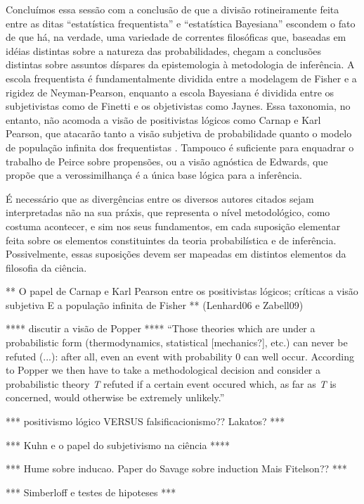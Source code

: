 Concluímos essa sessão com a conclusão de que a divisão rotineiramente feita entre as ditas ``estatística frequentista'' e 
``estatística Bayesiana'' escondem o fato de que há, na verdade, uma variedade de correntes filosóficas que, baseadas
em idéias distintas sobre a natureza das probabilidades, chegam a conclusões distintas sobre assuntos díspares da epistemologia 
à metodologia de inferência. A escola frequentista é fundamentalmente dividida entre a modelagem de Fisher e a rigidez de
Neyman-Pearson, enquanto a escola Bayesiana é dividida entre os subjetivistas como de Finetti e os objetivistas como Jaynes.
Essa taxonomia, no entanto, não acomoda a visão de positivistas lógicos como Carnap e Karl Pearson, que atacarão tanto
a visão subjetiva de probabilidade quanto o modelo de população infinita dos frequentistas \citep{Lenhard06, Zabell09}.
Tampouco é suficiente para enquadrar o trabalho de Peirce sobre propensões, ou a visão agnóstica de Edwards, que propõe
que a verossimilhança é a única base lógica para a inferência.

É necessário que as divergências entre os diversos autores citados sejam interpretadas não na sua práxis, que representa 
o nível metodológico, como costuma acontecer, e sim nos seus fundamentos, em cada suposição elementar feita sobre os
elementos constituintes da teoria probabilística e de inferência. Possivelmente, essas suposições devem ser mapeadas em
distintos elementos da filosofia da ciência.



** O papel de Carnap e Karl Pearson entre os positivistas lógicos; críticas a visão subjetiva E a população infinita de Fisher **
(Lenhard06 e Zabell09)

**** discutir a visão de Popper ****
``Those theories which are under a probabilistic form (thermodynamics, statistical [mechanics?], etc.) can never be refuted (...):
after all, even an event with probability 0 can well occur. According to Popper we then have to take a methodological decision
and consider a probabilistic theory {\em T} refuted if a certain event occured which, as far as {\em T} is concerned, would 
otherwise be extremely unlikely.'' \citep{deFinetti2010}

*** positivismo lógico VERSUS falsificacionismo?? Lakatos? ***

*** Kuhn e o papel do subjetivismo na ciência ****

*** Hume sobre inducao. Paper do Savage sobre induction  Mais Fitelson??  ***

*** Simberloff e testes de hipoteses ***

